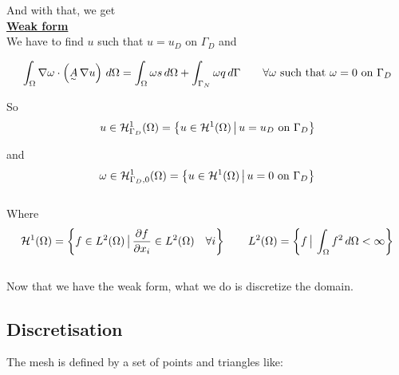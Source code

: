 And with that, we get \\

\underline{\textbf{Weak form}} \\

We have to find $u$ such that $u = u_D$ on $\Gamma_D$ and 

\[
  \int_{\Omega} \nabla\omega\cdot\left(\underset{^\sim}{A}\,\nabla u\right)\,d\Omega = \int_\Omega \omega s \, d\Omega + \int_{\Gamma_N} \omega q \, d\Gamma \qquad \forall \omega \text{ such that } \omega = 0 \text{ on } \Gamma_D
\]
\newpage

So $$u \in \mathcal{H}_{\Gamma_D}^1(\Omega) = \left\{u\in\mathcal{H}^1(\Omega)\, \big| \, u=u_D \text{ on } \Gamma_D\right\}$$

and $$\omega \in \mathcal{H}_{\Gamma_D,0}^1(\Omega) = \left\{u \in \mathcal{H}^1(\Omega) \,\big| \, u = 0 \text{ on } \Gamma_D\right\}$$ \-\\
Where $$\mathcal{H}^1(\Omega) = \left\{f\in L^2(\Omega)\, \big| \, \frac{\partial f}{\partial x_i}\in L^2(\Omega)\quad \forall i\right\} \qquad L^2(\Omega) = \left\{f \, \big| \, \int_{\Omega} f^2\,d\Omega < \infty\right\}$$\-\\

Now that we have the weak form, what we do is discretize the domain.

\subsection{Discretisation}

The mesh is defined by a set of points and triangles like:

